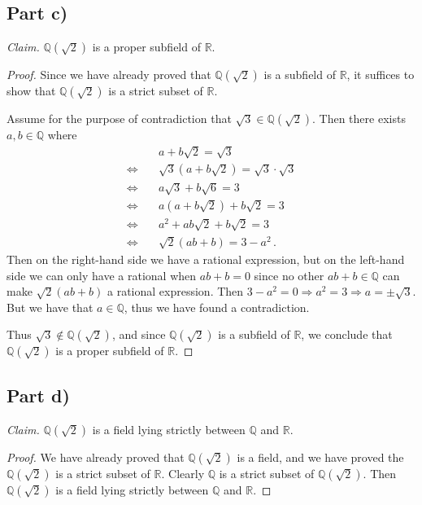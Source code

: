 \documentclass{abrice}
\newcommand{\R}{\mathbb{R}}
\newcommand{\Q}{\mathbb{Q}}
\begin{document}
\subsection{Part c)}

\emph{Claim.} $\Q(\sqrt 2)$ is a proper subfield of $\R$.

\begin{proof}
  Since we have already proved that $\Q(\sqrt 2)$ is a subfield of $\R$, it
  suffices to show that $\Q(\sqrt 2)$ is a strict subset of $\R$.

  Assume for the purpose of contradiction that $\sqrt{3} \in \Q(\sqrt 2)$. Then
  there exists $a,b \in \Q$ where
  \begin{align*}
    &a + b \sqrt 2 = \sqrt 3 \\ \Longleftrightarrow \quad
    &\sqrt 3(a + b \sqrt 2) = \sqrt 3 \cdot \sqrt 3 \\ \Longleftrightarrow \quad
    &a \sqrt 3 + b \sqrt 6 = 3 \\ \Longleftrightarrow \quad
    &a (a + b \sqrt 2) + b \sqrt 2 = 3 \\ \Longleftrightarrow \quad
    &a^2 + ab\sqrt 2 + b \sqrt 2 = 3 \\ \Longleftrightarrow \quad
    & \sqrt 2 (ab + b) = 3 - a^2\, .
  \end{align*}
  Then on the right-hand side we have a rational expression, but on the
  left-hand side we can only have a rational when $ab + b = 0$ since no other
  $ab + b \in \Q$ can make $\sqrt 2 (ab + b)$ a rational expression. Then $3 -
  a^2 = 0 \Rightarrow a^2 = 3 \Rightarrow a = \pm \sqrt 3$. But we have that $a
  \in \Q$, thus we have found a contradiction.

  Thus $\sqrt 3 \notin \Q(\sqrt 2)$, and since $\Q(\sqrt 2)$ is a subfield of
  $\R$, we conclude that $\Q(\sqrt 2)$ is a proper subfield of $\R$.
\end{proof}

\subsection{Part d)}

\emph{Claim.} $\Q(\sqrt 2)$ is a field lying strictly between $\Q$ and $\R$.

\begin{proof}
  We have already proved that $\Q(\sqrt 2)$ is a field, and we have proved the
  $\Q(\sqrt 2)$ is a strict subset of $\R$. Clearly $\Q$ is a strict subset of
  $\Q(\sqrt 2)$. Then $\Q(\sqrt 2)$ is a field lying strictly between $\Q$ and
  $\R$.
\end{proof}
\end{document}
